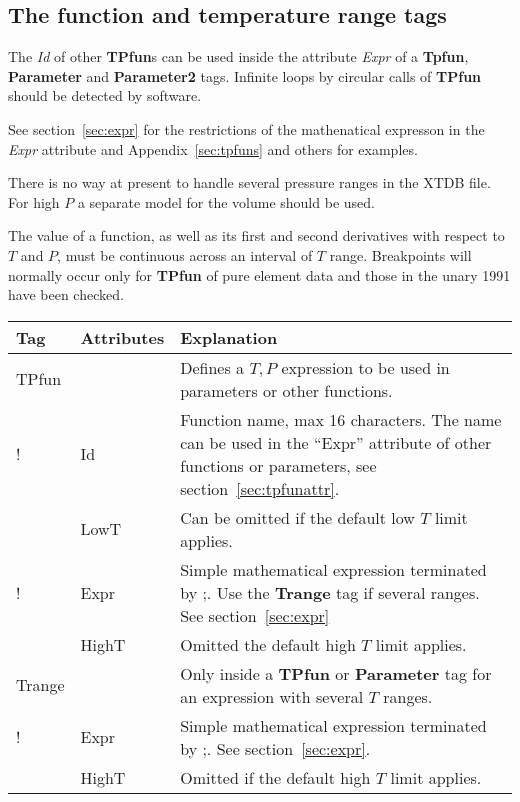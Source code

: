 \documentclass{article}
\begin{document}
\subsection{The function and temperature range tags}\label{sec:tpfun}

The {\em Id} of other {\bf TPfun}s can be used inside the attribute
{\em Expr} of a {\bf Tpfun}, {\bf Parameter} and {\bf Parameter2}
tags.  Infinite loops by circular calls of {\bf TPfun} should be
detected by software.

See section~\ref{sec:expr} for the restrictions of the mathenatical
expresson in the {\em Expr} attribute and Appendix~\ref{sec:tpfuns}
and others for examples.

There is no way at present to handle several pressure ranges in the
XTDB file.  For high $P$ a separate model for the volume should be
used.

The value of a function, as well as its first and second derivatives
with respect to $T$ and $P$, must be continuous across an interval of
$T$ range.  Breakpoints will normally occur only for {\bf TPfun} of
pure element data and those in the unary 1991 have been checked.

\begin{tabular}{|p{} p{} p{}|}\hline
  Tag & Attributes & Explanation\\\hline

  TPfun & & Defines a $T, P$ expression to be used in parameters or other functions.\\
!        & Id & Function name, max 16 characters. The name can be used in the ``Expr'' attribute of other functions or parameters, see section~\ref{sec:tpfunattr}.\\
        & LowT & Can be omitted if the default low $T$ limit applies.\\
!       & Expr &  Simple mathematical expression terminated by ;.   Use the {\bf Trange} tag if several ranges.  See section~\ref{sec:expr}\\
        & HighT & Omitted the default high $T$ limit applies.\\\hline

  Trange & & Only inside a {\bf TPfun} or {\bf Parameter} tag for an expression with several $T$ ranges.\\ 
!         & Expr & Simple mathematical expression terminated by ;.  See section~\ref{sec:expr}.\\
         & HighT & Omitted if the default high $T$ limit applies.\\\hline
\end{tabular}
\end{document}
